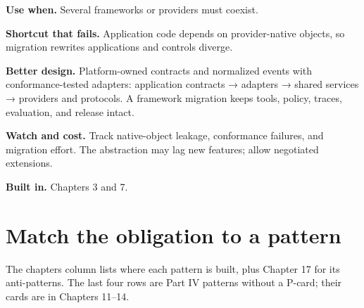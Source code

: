 \textbf{Use when.} Several frameworks or providers must coexist.\par

\textbf{Shortcut that fails.} Application code depends on provider-native objects, so migration rewrites applications and controls diverge.\par

\textbf{Better design.} Platform-owned contracts and normalized events with conformance-tested adapters: application contracts → adapters → shared services → providers and protocols. A framework migration keeps tools, policy, traces, evaluation, and release intact.\par

\textbf{Watch and cost.} Track native-object leakage, conformance failures, and migration effort. The abstraction may lag new features; allow negotiated extensions.\par

\textbf{Built in.} Chapters 3 and 7.\par

\section{Match the obligation to a pattern}

The chapters column lists where each pattern is built, plus Chapter 17 for its anti-patterns. The last four rows are Part IV patterns without a P-card; their cards are in Chapters 11–14.\par

